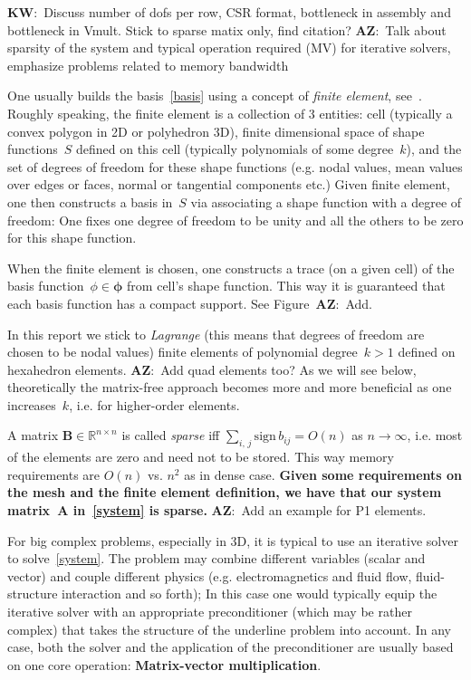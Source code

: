 \documentclass[12pt]{article}
\newcommand{\vect}[1]{\boldsymbol{\mathbf{#1}}}
\newcommand{\AZ}[1]{{\color{red}\textbf{AZ}:~#1}}
\newcommand{\KW}[1]{{\color{blue}\textbf{KW}:~#1}}
\newcommand{\dimSize}{n}
\begin{document}
\KW{Discuss number of dofs per row, CSR format, bottleneck in assembly and bottleneck in Vmult. Stick to sparse matix only, find citation?} 
\AZ{Talk about sparsity of the system and typical operation required (MV) for iterative solvers, emphasize problems related to memory bandwidth}


One usually builds the basis~\eqref{basis} using a concept of \textit{finite element}, see~\cite{ciarlet2002finite}. Roughly speaking, the finite element is a collection of 3 entities: cell (typically a convex polygon in 2D or polyhedron 3D), finite dimensional space of shape functions~$S$ defined on this cell (typically polynomials of some degree~$k$), and the set of degrees of freedom for these shape functions (e.g. nodal values, mean values over edges or faces, normal or tangential components etc.) Given finite element, one then constructs a basis in~$S$ via associating a shape function with a degree of freedom: One fixes one degree of freedom to be unity and all the others to be zero for this shape function. 

When the finite element is chosen, one constructs a trace (on a given cell) of the basis function~${\phi \in \vect\phi}$ from cell's shape function. This way it is guaranteed that each basis function has a compact support. See Figure~\AZ{Add.}

In this report we stick to \textit{Lagrange} (this means that degrees of freedom are chosen to be nodal values) finite elements of polynomial degree~$k > 1$ defined on hexahedron elements. \AZ{Add quad elements too?} As we will see below, theoretically the matrix-free approach becomes more and more beneficial as one increases~$k$, i.e. for higher-order elements. 

A matrix $\vect B \in \mathbb R^{\dimSize\times\dimSize}$ is called \textit{sparse} iff $\sum_{i,\,j} \mbox{sign}\,b_{ij} = O(\dimSize)$ as $\dimSize \rightarrow \infty$, i.e. most of the elements are zero and need not to be stored. This way memory requirements are $O(\dimSize)$ vs. $\dimSize^2$ as in dense case. \textbf{Given some requirements on the mesh and the finite element definition, we have that our system matrix~$\vect A$ in~\eqref{system} is sparse.} \AZ{Add an example for P1 elements.}

For big complex problems, especially in 3D, it is typical to use an iterative solver to solve~\eqref{system}. The problem may combine different variables (scalar and vector) and couple different physics (e.g. electromagnetics and fluid flow, fluid-structure interaction and so forth); In this case one would typically equip the iterative solver with an appropriate preconditioner (which may be rather complex) that takes the structure of the underline problem into account. In any case, both the solver and the application of the preconditioner are usually based on one core operation: \textbf{Matrix-vector multiplication}.
\end{document}
